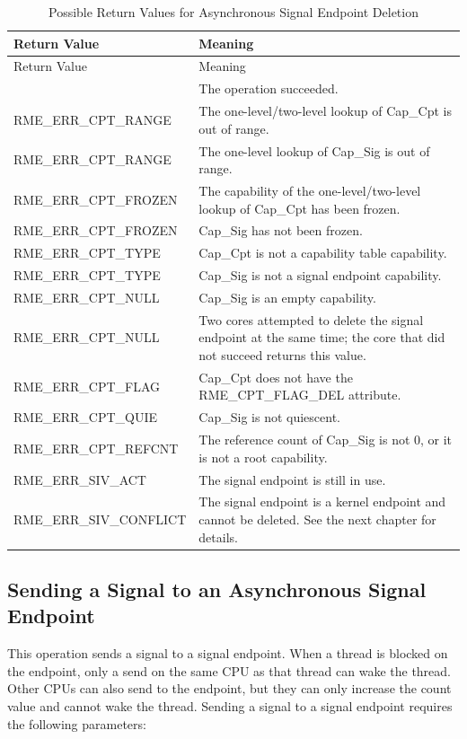 \begin{xltabular}{\textwidth}{@{}>{\hsize\raggedright\arraybackslash}X>{\hsize\raggedright\arraybackslash}X@{}}
\caption{Possible Return Values for Asynchronous Signal Endpoint Deletion}\label{tab:5-19-delete-signal-endpoint-return-values}\\
\toprule
Return Value & Meaning\tabularnewline
\endfirsthead
\toprule
Return Value & Meaning\tabularnewline
\midrule
\endhead
\bottomrule
{} & The operation succeeded.\tabularnewline
    RME\_ERR\_CPT\_RANGE & The one-level/two-level lookup of Cap\_Cpt is out of range.\tabularnewline
    RME\_ERR\_CPT\_RANGE & The one-level lookup of Cap\_Sig is out of range.\tabularnewline
    RME\_ERR\_CPT\_FROZEN & The capability of the one-level/two-level lookup of Cap\_Cpt has been frozen.\tabularnewline
    RME\_ERR\_CPT\_FROZEN & Cap\_Sig has not been frozen.\tabularnewline
    RME\_ERR\_CPT\_TYPE & Cap\_Cpt is not a capability table capability.\tabularnewline
    RME\_ERR\_CPT\_TYPE & Cap\_Sig is not a signal endpoint capability.\tabularnewline
    RME\_ERR\_CPT\_NULL & Cap\_Sig is an empty capability.\tabularnewline
    RME\_ERR\_CPT\_NULL & Two cores attempted to delete the signal endpoint at the same time; the core that did not succeed returns this value.\tabularnewline
    RME\_ERR\_CPT\_FLAG & Cap\_Cpt does not have the RME\_CPT\_FLAG\_DEL attribute.\tabularnewline
    RME\_ERR\_CPT\_QUIE & Cap\_Sig is not quiescent.\tabularnewline
    RME\_ERR\_CPT\_REFCNT & The reference count of Cap\_Sig is not 0, or it is not a root capability.\tabularnewline
    RME\_ERR\_SIV\_ACT & The signal endpoint is still in use.\tabularnewline
    RME\_ERR\_SIV\_CONFLICT & The signal endpoint is a kernel endpoint and cannot be deleted. See the next chapter for details.\tabularnewline
\end{xltabular}
\nopagebreak[4]

\subsection{Sending a Signal to an Asynchronous Signal Endpoint}\label{subsec:5-send-signal-to-signal-endpoint}
\nopagebreak[4]

This operation sends a signal to a signal endpoint. When a thread is blocked on the endpoint, only a send on the same CPU as that thread can wake the thread. Other CPUs can also send to the endpoint, but they can only increase the count value and cannot wake the thread. Sending a signal to a signal endpoint requires the following parameters:

